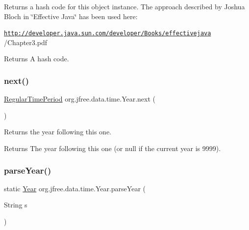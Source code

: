 Returns a hash code for this object instance. The approach described by Joshua Bloch in \char`\"{}\+Effective Java\char`\"{} has been used here\+: 

{\ttfamily \href{http://developer.java.sun.com/developer/Books/effectivejava}{\tt http\+://developer.\+java.\+sun.\+com/developer/\+Books/effectivejava} /\+Chapter3.pdf}

\begin{DoxyReturn}{Returns}
A hash code. 
\end{DoxyReturn}
\mbox{\label{classorg_1_1jfree_1_1data_1_1time_1_1_year_a6eb70611dd73047ccce20c9c0d1c21fb}} 
\subsubsection{\texorpdfstring{next()}{next()}}
{\footnotesize\ttfamily \mbox{\hyperlink{classorg_1_1jfree_1_1data_1_1time_1_1_regular_time_period}{Regular\+Time\+Period}} org.\+jfree.\+data.\+time.\+Year.\+next (\begin{DoxyParamCaption}{ }\end{DoxyParamCaption})}

Returns the year following this one.

\begin{DoxyReturn}{Returns}
The year following this one (or {\ttfamily null} if the current year is 9999). 
\end{DoxyReturn}
\mbox{\label{classorg_1_1jfree_1_1data_1_1time_1_1_year_a46251fbdfaeb9fb60f90d164ed1173cf}} 
\subsubsection{\texorpdfstring{parse\+Year()}{parseYear()}}
{\footnotesize\ttfamily static \mbox{\hyperlink{classorg_1_1jfree_1_1data_1_1time_1_1_year}{Year}} org.\+jfree.\+data.\+time.\+Year.\+parse\+Year (\begin{DoxyParamCaption}\item[{String}]{s }\end{DoxyParamCaption})\hspace{0.3cm}{\ttfamily [static]}}

